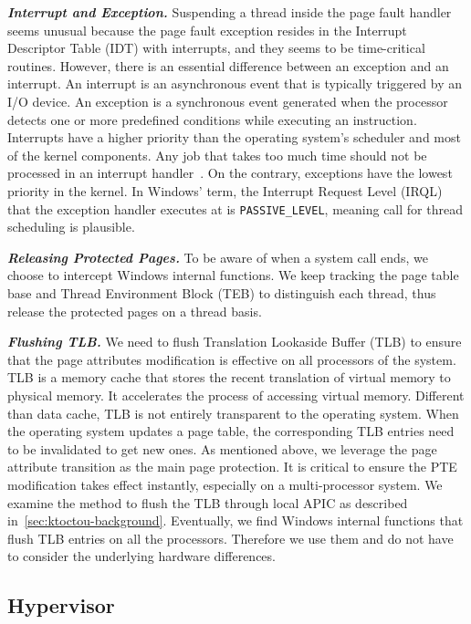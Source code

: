 \textbf{\textit{Interrupt and Exception.}} Suspending a thread inside the page fault handler seems unusual because the page fault exception resides in the Interrupt Descriptor Table (IDT) with interrupts, and they seems to be time-critical routines. However, there is an essential difference between an exception and an interrupt. An interrupt is an asynchronous event that is typically triggered by an I/O device. An exception is a synchronous event generated when the processor detects one or more predefined conditions while executing an instruction. Interrupts have a higher priority than the operating system's scheduler and most of the kernel components. Any job that takes too much time should not be processed in an interrupt handler~\cite{msdnwatchdog}.  On the contrary, exceptions have the lowest priority in the kernel. In Windows' term, the Interrupt Request Level (IRQL) that the exception handler executes at is \texttt{PASSIVE\_LEVEL}, meaning call for thread scheduling is plausible.



\textbf{\textit{Releasing Protected Pages.}} To be aware of when a system call ends, we choose to intercept Windows internal functions. We keep tracking the page table base and Thread Environment Block (TEB) to distinguish each thread, thus release the protected pages on a thread basis.


\textbf{\textit{Flushing TLB.}} We need to flush Translation Lookaside Buffer (TLB) to ensure that the page attributes modification is effective on all processors of the system. TLB is a memory cache that stores the recent translation of virtual memory to physical memory. It accelerates the process of accessing virtual memory. Different than data cache, TLB is not entirely transparent to the operating system. When the operating system updates a page table, the corresponding TLB entries need to be invalidated to get new ones. As mentioned above, we leverage the page attribute transition as the main page protection. It is critical to ensure the PTE modification takes effect instantly, especially on a multi-processor system. We examine the method to flush the TLB through local APIC as described in~\autoref{sec:ktoctou-background}. Eventually, we find Windows internal functions that flush TLB entries on all the processors. Therefore we use them and do not have to consider the underlying hardware differences.


\subsection{Hypervisor}


